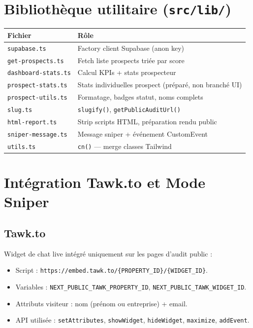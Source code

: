 \documentclass[11pt,a4paper]{report}
\begin{document}
\chapter{Bibliothèque utilitaire (\texttt{src/lib/})}

\begin{table}[h]
\centering
\small
\begin{tabular}{@{}lp{9cm}@{}}
\toprule
\textbf{Fichier} & \textbf{Rôle} \\
\midrule
\texttt{supabase.ts} & Factory client Supabase (anon key) \\
\texttt{get-prospects.ts} & Fetch liste prospects triée par score \\
\texttt{dashboard-stats.ts} & Calcul KPIs + stats prospecteur \\
\texttt{prospect-stats.ts} & Stats individuelles prospect (préparé, non branché UI) \\
\texttt{prospect-utils.ts} & Formatage, badges statut, noms complets \\
\texttt{slug.ts} & \texttt{slugify()}, \texttt{getPublicAuditUrl()} \\
\texttt{html-report.ts} & Strip scripts HTML, préparation rendu public \\
\texttt{sniper-message.ts} & Message sniper + événement CustomEvent \\
\texttt{utils.ts} & \texttt{cn()} --- merge classes Tailwind \\
\bottomrule
\end{tabular}
\end{table}

\chapter{Intégration Tawk.to et Mode Sniper}\label{ch:sniper}

\section{Tawk.to}

Widget de chat live intégré uniquement sur les pages d'audit public :

\begin{itemize}[leftmargin=*]
  \item Script : \texttt{https://embed.tawk.to/\{PROPERTY\_ID\}/\{WIDGET\_ID\}}.
  \item Variables : \texttt{NEXT\_PUBLIC\_TAWK\_PROPERTY\_ID}, \texttt{NEXT\_PUBLIC\_TAWK\_WIDGET\_ID}.
  \item Attributs visiteur : nom (prénom ou entreprise) + email.
  \item API utilisée : \texttt{setAttributes}, \texttt{showWidget}, \texttt{hideWidget}, \texttt{maximize}, \texttt{addEvent}.
\end{itemize}
\end{document}
